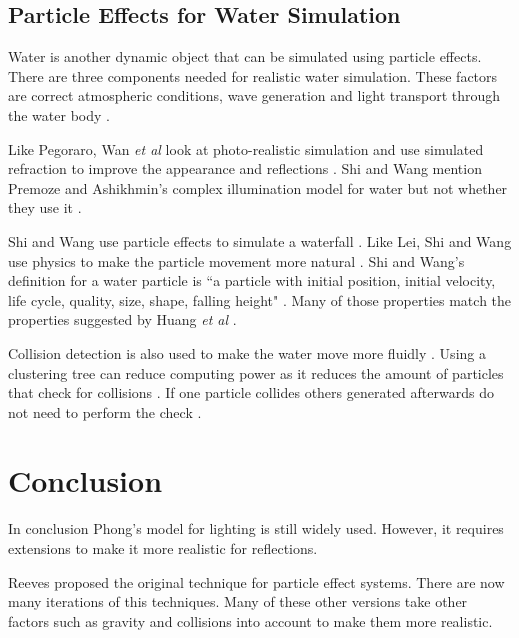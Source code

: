 \documentclass{scrartcl}
\begin{document}
\subsection{Particle Effects for Water Simulation}
Water is another dynamic object that can be simulated using particle effects. There are three components needed for realistic water simulation. These factors are correct atmospheric conditions, wave generation and light transport through the water body \cite{Premoze}.

Like Pegoraro, Wan \textit{et al} look at photo-realistic simulation and use simulated refraction to improve the appearance and reflections \cite{Pegoraro, Wan}.  Shi and Wang mention Premoze and Ashikhmin's complex illumination model for water but not whether they use it \cite{Premoze}.

Shi and Wang use particle effects to simulate a waterfall \cite{Shi}. Like Lei, Shi and Wang use physics to make the particle movement more natural \cite{Lei, Shi}.  Shi and Wang's definition for a water particle is ``a particle with initial position, initial velocity, life cycle, quality, size, shape, falling height"  \cite[p.1]{Shi}.  Many of those properties match the properties suggested by Huang \textit{et al} \cite{Huang }.

Collision detection is also used to make the water move more fluidly \cite{Shi}. Using a clustering tree can reduce computing power as it reduces the amount of particles that check for collisions \cite{Shi}. If one particle collides others generated afterwards do not need to perform the check \cite{Shi}.

\section{Conclusion}
In conclusion Phong's model for lighting is still widely used. However, it requires extensions to make it more realistic for reflections.

Reeves proposed the original technique for particle effect systems. There are now many iterations of this techniques. Many of these other versions take other factors such as gravity and collisions into account to make them more realistic. 

	


	
\end{document}

